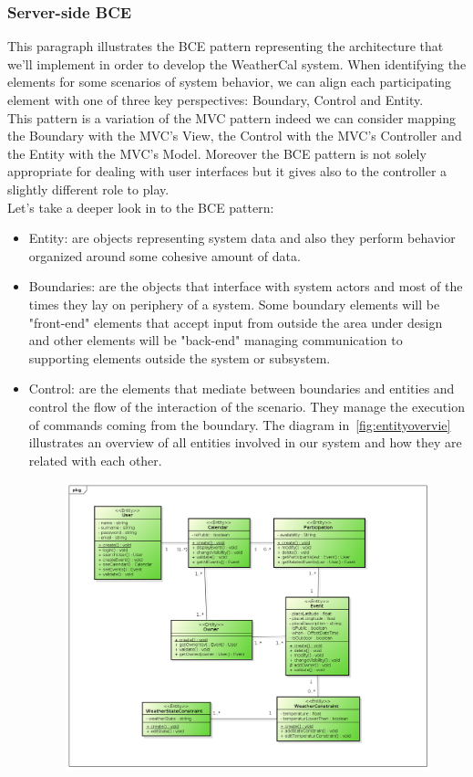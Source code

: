 \subsubsection{Server-side BCE}\label{sec:BCE}
This paragraph illustrates the BCE pattern representing the architecture that we'll implement in order to develop the WeatherCal system. When identifying the elements for some scenarios of system behavior, we can align each participating element with one of three key perspectives: Boundary, Control and Entity. \\This  pattern is a variation of the MVC pattern indeed we can consider mapping the Boundary with the MVC's View, the Control with the MVC's Controller and the Entity with the MVC's Model. Moreover the BCE pattern is not solely appropriate for dealing with user interfaces but it gives also to the controller a slightly different role to play.\\Let's take a deeper look in to the BCE pattern:\begin{itemize}
\item Entity: are objects representing system data and also they perform behavior organized around some cohesive amount of data.
\item Boundaries: are the objects that interface with system actors and most of the times they lay on periphery of a system. Some boundary elements will be "front-end" elements that accept input from outside the area under design and other elements will be "back-end" managing communication to supporting elements outside the system or subsystem.
\item Control: are the elements that mediate between boundaries and entities and control the flow of the interaction of the scenario. They manage the execution of commands coming from the boundary.
The diagram in~\ref{fig:entityovervie} illustrates an overview of all entities involved in our system and how they are related with each other.
 \begin{center}
 \begin{figure}[H]
    \includegraphics[width=1\textwidth]{../BCEDiagram/BCE/EntityOverview/Entity.png}

\end{figure}
\end{center}
\end{itemize}
